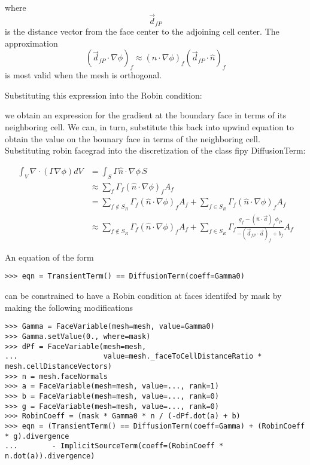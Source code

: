 \documentclass{article}
\begin{document}
where
\begin{equation*}
\vec{d}_{fP}
\end{equation*}
is the distance vector from the face center to the adjoining cell center. The approximation 
\begin{equation*}
\left(\vec{d}_{fP}\cdot\nabla\phi\right)_f \approx \left(\hat{n}\cdot\nabla\phi\right)_f\left(\vec{d}_{fP}\cdot\hat{n}\right)_f
\end{equation*} 
is most valid when the mesh is orthogonal.

Substituting this expression into the Robin condition:

we obtain an expression for the gradient at the boundary face in terms of its neighboring cell. We can, in turn, substitute this back into upwind equation
to obtain the value on the bounary face in terms of the neighboring cell.
Substituting robin facegrad into the discretization of the class fipy DiffusionTerm:

\begin{equation*}
\begin{aligned}
\int_V \nabla\cdot\left(\Gamma\nabla\phi\right) dV
&= \int_S \Gamma \hat{n}\cdot\nabla\phi\, S \\
&\approx \sum_f \Gamma_f \left(\hat{n}\cdot\nabla\phi\right)_f A_f \\
&= \sum_{f \notin S_R} \Gamma_f \left(\hat{n}\cdot\nabla\phi\right)_f A_f
+ \sum_{f \in S_R} \Gamma_f \left(\hat{n}\cdot\nabla\phi\right)_f A_f \\
&\approx \sum_{f \notin S_R} \Gamma_f \left(\hat{n}\cdot\nabla\phi\right)_f A_f
+ \sum_{f \in S_R} \Gamma_f \frac{g_f - \left(\hat{n}\cdot\vec{a}\right)_f \phi_P}
                    {-\left(\vec{d}_{fP}\cdot\vec{a}\right)_f + b_f} A_f
\end{aligned}
\end{equation*} 

An equation of the form
\begin{verbatim}
>>> eqn = TransientTerm() == DiffusionTerm(coeff=Gamma0)
\end{verbatim} 
can be constrained to have a Robin condition at faces identifed by mask by making the following modifications
\begin{verbatim}
>>> Gamma = FaceVariable(mesh=mesh, value=Gamma0)
>>> Gamma.setValue(0., where=mask)
>>> dPf = FaceVariable(mesh=mesh,
...                    value=mesh._faceToCellDistanceRatio * mesh.cellDistanceVectors)
>>> n = mesh.faceNormals
>>> a = FaceVariable(mesh=mesh, value=..., rank=1)
>>> b = FaceVariable(mesh=mesh, value=..., rank=0)
>>> g = FaceVariable(mesh=mesh, value=..., rank=0)
>>> RobinCoeff = (mask * Gamma0 * n / (-dPf.dot(a) + b)
>>> eqn = (TransientTerm() == DiffusionTerm(coeff=Gamma) + (RobinCoeff * g).divergence
...        - ImplicitSourceTerm(coeff=(RobinCoeff * n.dot(a)).divergence)
\end{verbatim} 
\end{document}
